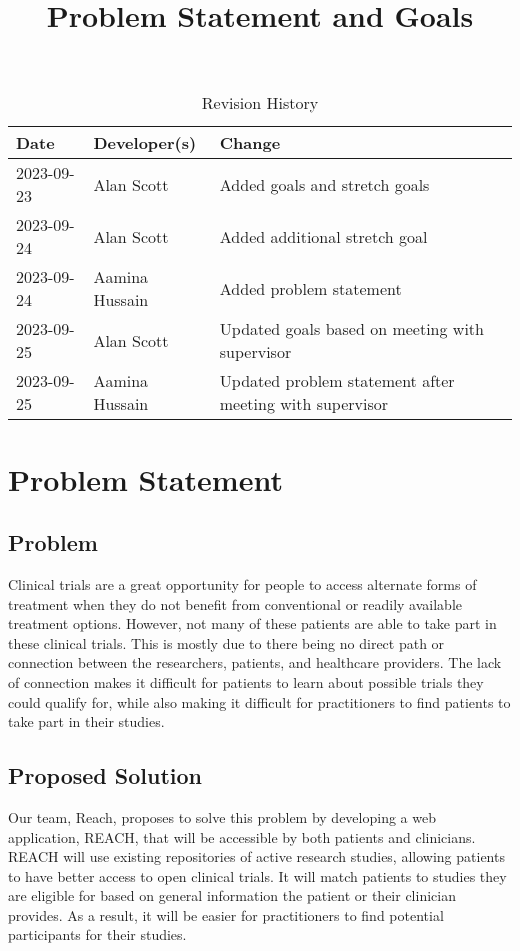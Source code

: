 \documentclass{article}
\title{Problem Statement and Goals\\\progname}
\author{\authname}
\date{}
\begin{document}
\maketitle

\begin{table}[hp]
\caption{Revision History} \label{TblRevisionHistory}
\begin{tabularx}{\textwidth}{llX}
\toprule
\textbf{Date} & \textbf{Developer(s)} & \textbf{Change}\\
\midrule
2023-09-23 & Alan Scott & Added goals and stretch goals\\
2023-09-24 & Alan Scott & Added additional stretch goal \\
2023-09-24 & Aamina Hussain & Added problem statement \\
2023-09-25 & Alan Scott & Updated goals based on meeting with supervisor \\
2023-09-25 & Aamina Hussain & Updated problem statement after meeting with supervisor \\
\bottomrule
\end{tabularx}
\end{table}

\section{Problem Statement}


\subsection{Problem}
Clinical trials are a great opportunity for people to access alternate forms of treatment when they do not benefit 
from conventional or readily available treatment options. However, not many of these patients are able to take part 
in these clinical trials. This is mostly due to there being no direct path or connection between the researchers, patients, 
and healthcare providers. The lack of connection makes it difficult for patients to learn about possible trials they could 
qualify for, while also making it difficult for practitioners to find patients to take part in their studies.

\subsection{Proposed Solution}
Our team, Reach, proposes to solve this problem by developing a web application, REACH, that will be accessible by both patients 
and clinicians. REACH will use existing repositories of active research studies, allowing patients to have better access to open 
clinical trials. It will match patients to studies they are eligible for based on general information the patient or their clinician 
provides. As a result, it will be easier for practitioners to find potential participants for their studies.
\end{document}
